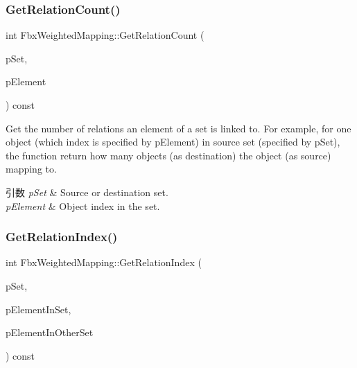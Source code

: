 \subsubsection{\texorpdfstring{Get\+Relation\+Count()}{GetRelationCount()}}
{\footnotesize\ttfamily int Fbx\+Weighted\+Mapping\+::\+Get\+Relation\+Count (\begin{DoxyParamCaption}\item[{\hyperlink{class_fbx_weighted_mapping_a3fb59c162b0c5b278f00e7bad4c578c6}{E\+Set}}]{p\+Set,  }\item[{int}]{p\+Element }\end{DoxyParamCaption}) const}

Get the number of relations an element of a set is linked to. For example, for one object (which index is specified by p\+Element) in source set (specified by p\+Set), the function return how many objects (as destination) the object (as source) mapping to. 
\begin{DoxyParams}{引数}
{\em p\+Set} & Source or destination set. \\
\hline
{\em p\+Element} & Object index in the set. \\
\hline
\end{DoxyParams}
\mbox{\label{class_fbx_weighted_mapping_a0903c7af1875b82c0c1edcc315d0ad3b}} 
\subsubsection{\texorpdfstring{Get\+Relation\+Index()}{GetRelationIndex()}}
{\footnotesize\ttfamily int Fbx\+Weighted\+Mapping\+::\+Get\+Relation\+Index (\begin{DoxyParamCaption}\item[{\hyperlink{class_fbx_weighted_mapping_a3fb59c162b0c5b278f00e7bad4c578c6}{E\+Set}}]{p\+Set,  }\item[{int}]{p\+Element\+In\+Set,  }\item[{int}]{p\+Element\+In\+Other\+Set }\end{DoxyParamCaption}) const}

